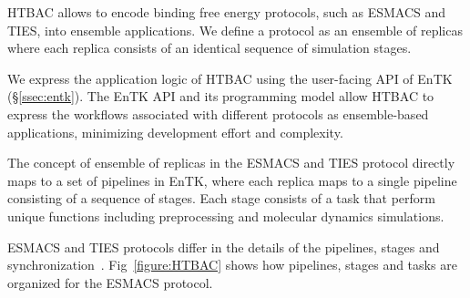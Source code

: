 HTBAC %
allows to %
encode binding free energy protocols, such as ESMACS and TIES, into ensemble
applications\@. We define a protocol as an ensemble of replicas where each
replica consists of an identical sequence of simulation stages.
 

We express the application logic of HTBAC using the user-facing API 
of EnTK (\S\ref{ssec:entk}). 
 
The EnTK %
API and its programming model 
 
allow HTBAC to express the workflows associated with different protocols as
ensemble-based applications, %
minimizing development effort and complexity.

The concept of %
ensemble of replicas in the ESMACS and TIES protocol directly maps to a set
of pipelines in EnTK, where each replica
 maps to a single
pipeline consisting of a sequence of stages. Each stage consists of a task
 that perform unique functions including preprocessing and
molecular dynamics simulations.  

ESMACS and TIES protocols differ in the details of the pipelines, stages and
synchronization~\cite{Bhati2017}.
Fig~\ref{figure:HTBAC} %
shows how pipelines, stages and tasks are organized for the ESMACS
protocol.


